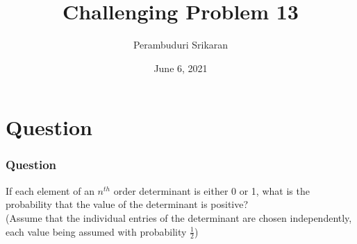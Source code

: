 \documentclass{beamer}
\title{Challenging Problem 13}
\author{Perambuduri Srikaran}
\institute{IITH AI}
\date{June 6, 2021}
\begin{document}
\providecommand{\pr}[1]{\ensuremath{\Pr\left(#1\right)}}
\providecommand{\qfunc}[1]{\ensuremath{Q\left(#1\right)}}
\providecommand{\sbrak}[1]{\ensuremath{{}\left[#1\right]}}
\providecommand{\lsbrak}[1]{\ensuremath{{}\left[#1\right.}}
\providecommand{\rsbrak}[1]{\ensuremath{{}\left.#1\right]}}
\providecommand{\brak}[1]{\ensuremath{\left(#1\right)}}
\providecommand{\lbrak}[1]{\ensuremath{\left(#1\right.}}
\providecommand{\rbrak}[1]{\ensuremath{\left.#1\right)}}
\providecommand{\cbrak}[1]{\ensuremath{\left\{#1\right\}}}
\providecommand{\lcbrak}[1]{\ensuremath{\left\{#1\right.}}
\providecommand{\rcbrak}[1]{\ensuremath{\left.#1\right\}}}
\begin{frame}
\titlepage
\end{frame}
\section{Question}
\begin{frame}
\frametitle{Question}
\begin{block}{}
If each element of an $n^{th}$ order determinant is either 0 or 1, what is the probability that the value of the determinant is positive?\\
(Assume that the individual entries of the determinant are chosen independently, each value being assumed with probability $\frac{1}{2}$)
\end{block}
\end{frame}
\end{document}

